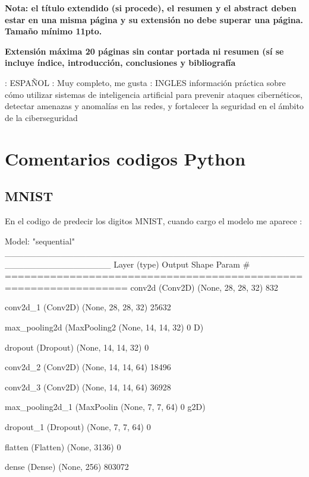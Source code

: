 \documentclass[11pt, a4paper]{article} %
\begin{document}
{\Large\textbf{Nota: el título extendido (si procede), el resumen y el abstract deben estar en una misma página y su extensión no debe superar una página. Tamaño mínimo 11pto.}}
\vspace{1cm}

{\Large\textbf{Extensión máxima 20 páginas sin contar portada ni resumen (sí se incluye índice, introducción, conclusiones y bibliografía}}
\newpage

\citep{olabe1998redes} : ESPAÑOL : Muy completo, me gusta
\citep{parisi2019hands} : INGLES información práctica sobre cómo utilizar sistemas de inteligencia artificial para prevenir ataques cibernéticos, detectar amenazas y anomalías en las redes, y fortalecer la seguridad en el ámbito de la ciberseguridad


\section{Comentarios codigos Python}

\subsection{MNIST}

En el codigo de predecir los digitos MNIST, cuando cargo el modelo me aparece :

Model: "sequential"
_________________________________________________________________
 Layer (type)                Output Shape              Param #   
=================================================================
 conv2d (Conv2D)             (None, 28, 28, 32)        832       

 conv2d_1 (Conv2D)           (None, 28, 28, 32)        25632

 max_pooling2d (MaxPooling2  (None, 14, 14, 32)        0
 D)

 dropout (Dropout)           (None, 14, 14, 32)        0

 conv2d_2 (Conv2D)           (None, 14, 14, 64)        18496

 conv2d_3 (Conv2D)           (None, 14, 14, 64)        36928

 max_pooling2d_1 (MaxPoolin  (None, 7, 7, 64)          0
 g2D)

 dropout_1 (Dropout)         (None, 7, 7, 64)          0

 flatten (Flatten)           (None, 3136)              0

 dense (Dense)               (None, 256)               803072
\end{document}
